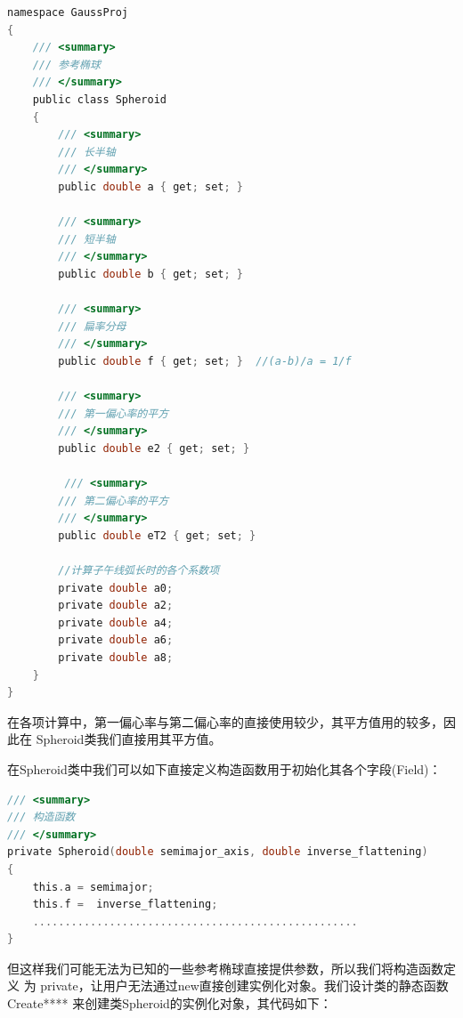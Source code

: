 \begin{lstlisting}[language=C]
namespace GaussProj
{
    /// <summary>
    /// 参考椭球
    /// </summary>
    public class Spheroid
    {
        /// <summary>
        /// 长半轴
        /// </summary>
        public double a { get; set; }

        /// <summary>
        /// 短半轴
        /// </summary>
        public double b { get; set; }

        /// <summary>
        /// 扁率分母
        /// </summary>
        public double f { get; set; }  //(a-b)/a = 1/f

        /// <summary>
        /// 第一偏心率的平方
        /// </summary>
        public double e2 { get; set; }

         /// <summary>
        /// 第二偏心率的平方
        /// </summary>
        public double eT2 { get; set; }

        //计算子午线弧长时的各个系数项
        private double a0;
        private double a2;
        private double a4;
        private double a6;
        private double a8;
    }
}
\end{lstlisting}

在各项计算中，第一偏心率与第二偏心率的直接使用较少，其平方值用的较多，因此在
Spheroid类我们直接用其平方值。

 在Spheroid类中我们可以如下直接定义构造函数用于初始化其各个字段(Field)：
  \begin{lstlisting}[language=C]
/// <summary>
/// 构造函数
/// </summary>
private Spheroid(double semimajor_axis, double inverse_flattening)
{
    this.a = semimajor;
    this.f =  inverse_flattening;
    ...................................................
}
\end{lstlisting}

但这样我们可能无法为已知的一些参考椭球直接提供参数，所以我们将构造函数定义
为 private，让用户无法通过new直接创建实例化对象。我们设计类的静态函数
Create**** 来创建类Spheroid的实例化对象，其代码如下：

